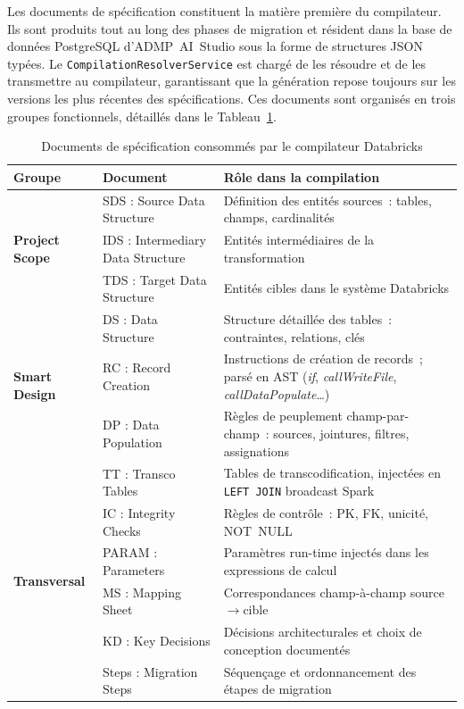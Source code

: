 Les documents de spécification constituent la matière première du compilateur. Ils sont produits tout au long des phases de migration et résident dans la base de données PostgreSQL d'ADMP~AI~Studio sous la forme de structures JSON typées. Le \texttt{CompilationResolverService} est chargé de les résoudre et de les transmettre au compilateur, garantissant que la génération repose toujours sur les versions les plus récentes des spécifications. Ces documents sont organisés en trois groupes fonctionnels, détaillés dans le Tableau~\ref{tab:docs-entree}.

\begin{table}[H]
\centering
\caption{Documents de spécification consommés par le compilateur Databricks}
\label{tab:docs-entree}
\begin{tabularx}{\textwidth}{llX}
\toprule
\textbf{Groupe} & \textbf{Document} & \textbf{Rôle dans la compilation} \\
\midrule
\multirow{3}{*}{\textbf{Project Scope}}
  & SDS : Source Data Structure     & Définition des entités sources~: tables, champs, cardinalités \\
  & IDS : Intermediary Data Structure & Entités intermédiaires de la transformation \\
  & TDS : Target Data Structure      & Entités cibles dans le système Databricks \\
\midrule
\multirow{3}{*}{\textbf{Smart Design}}
  & DS : Data Structure   & Structure détaillée des tables~: contraintes, relations, clés \\
  & RC : Record Creation  & Instructions de création de records~; parsé en AST (\textit{if}, \textit{callWriteFile}, \textit{callDataPopulate}\ldots) \\
  & DP : Data Population  & Règles de peuplement champ-par-champ~: sources, jointures, filtres, assignations \\
\midrule
\multirow{6}{*}{\textbf{Transversal}}
  & TT : Transco Tables    & Tables de transcodification, injectées en \texttt{LEFT JOIN} broadcast Spark \\
  & IC : Integrity Checks  & Règles de contrôle~: PK, FK, unicité, NOT~NULL \\
  & PARAM : Parameters     & Paramètres run-time injectés dans les expressions de calcul \\
  & MS : Mapping Sheet     & Correspondances champ-à-champ source$\rightarrow$cible \\
  & KD : Key Decisions     & Décisions architecturales et choix de conception documentés \\
  & Steps : Migration Steps & Séquençage et ordonnancement des étapes de migration \\
\bottomrule
\end{tabularx}
\end{table}

